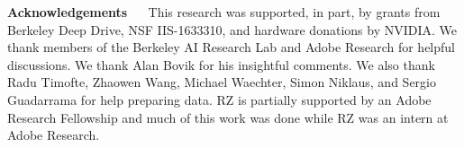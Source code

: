 \documentclass[10pt,twocolumn,letterpaper]{article}
\renewcommand{\paragraph}[1]{\vspace{5px} \noindent \textbf{#1} \ \ }
\begin{document}












\vspace{-1mm}
{\paragraph{Acknowledgements} This research was supported, in part, by grants from Berkeley Deep Drive, NSF IIS-1633310, and hardware donations by NVIDIA. We thank members of the Berkeley AI Research Lab and Adobe Research for helpful discussions. We thank Alan Bovik for his insightful comments. We also thank Radu Timofte, Zhaowen Wang, Michael Waechter, Simon Niklaus, and Sergio Guadarrama for help preparing data. RZ is partially supported by an Adobe Research Fellowship and much of this work was done while RZ was an intern at Adobe Research.}

{\small


}

\appendix




\end{document}
